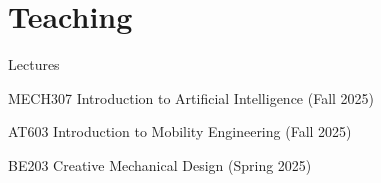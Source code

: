 \section{Teaching}

\begin{pubSubsectionNum}{Lectures}
    \item MECH307 Introduction to Artificial Intelligence (Fall 2025)
    \item AT603 Introduction to Mobility Engineering (Fall 2025)
    \item BE203 Creative Mechanical Design (Spring 2025)
\end{pubSubsectionNum}
